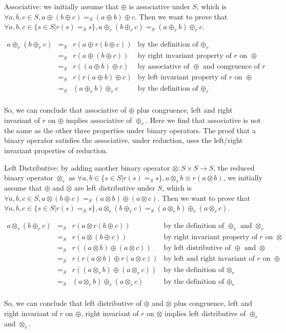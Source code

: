 \documentclass[a4paper,12pt,twoside,openright]{report}
\newcommand{\e}[2]{
\begin{equation}
  \label{#1} 
  #2
\end{equation}
}
\begin{document}
Associative: we initially assume that $\oplus$ is associative under $S$, which is $\forall a,b,c \in S, a \oplus (b \oplus c) =_S (a \oplus b) \oplus c$. Then we want to prove that $\forall a,b,c \in \{s \in S | r(s) =_S s\}, a \oplus_r (b \oplus_r c) =_S (a \oplus_r b) \oplus_r c$. 
\e{r:proof:associative}{
\begin{array}{rcll} 
a \oplus_r (b \oplus_r c) & =_S & r(a \oplus r(b \oplus c)) &\mbox{by the definition of $\oplus_r$} \\
			 & =_S & r(a \oplus (b \oplus c)) &\mbox{by right invariant property of $r$ on $\oplus$}\\
			 & =_S & r((a \oplus b) \oplus c) &\mbox{by associative of $\oplus$ and congruence of $r$}\\
			 & =_S & r(r(a \oplus b) \oplus c) &\mbox{by left invariant property of $r$ on $\oplus$}\\
             & =_S & (a \oplus_r b) \oplus_r c  &\mbox{by the definition of $\oplus_r$} \\
\end{array}}
So, we can conclude that associative of $\oplus$ plus congruence, left and right invariant of $r$ on $\oplus$ implies associative of $\oplus_r$. Here we find that associative is not the same as the other three properties under binary operators. The proof that a binary operator satisfies the associative, under reduction, uses the left/right invariant properties of reduction. 

Left Distributive: by adding another binary operator $\otimes : S \times S \rightarrow S$, the reduced binary operator $\otimes_r$ as $\forall a,b \in \{s \in S | r(s) =_S s\}, a \otimes_r b \equiv r(a \otimes b)$, we initially assume that $\oplus$ and $\otimes$ are left distributive under $S$, which is $\forall a,b,c \in S, a \otimes (b \oplus c) =_S (a \otimes b) \oplus (a \otimes c)$. Then we want to prove that $\forall a,b,c \in \{s \in S | r(s) =_S s\}, a \otimes_r (b \oplus_r c) =_S (a \otimes_r b) \oplus_r (a \otimes_r c)$. 
\e{r:proof:left_distributive}{
\begin{array}{rcll} 
a \otimes_r (b \oplus_r c) & =_S & r(a \otimes r(b \oplus c)) &\mbox{by the definition of $\oplus_r$ and $\otimes_r$} \\
			 & =_S & r(a \otimes (b \oplus c)) &\mbox{by right invariant property of $r$ on $\otimes$}\\
			 & =_S & r((a \otimes b) \oplus (a \otimes c)) &\mbox{by left distributive of $\oplus$ and $\otimes$}\\
			 & =_S & r(r(a \otimes b) \oplus r(a \otimes c)) &\mbox{by left and right invariant of $r$ on $\oplus$}\\			 
			 & =_S & r((a \otimes_r b) \oplus (a \otimes_r c)) &\mbox{by the definition of $\otimes_r$}\\
             & =_S & (a \otimes_r b) \oplus_r (a \otimes_r c)  &\mbox{by the definition of $\oplus_r$} \\
\end{array}}
So, we can conclude that left distributive of $\oplus$ and $\otimes$ plus congruence, left and right invariant of $r$ on $\oplus$, right invariant of $r$ on $\otimes$ implies left distributive of $\oplus_r$ and $\otimes_r$.
\end{document}
